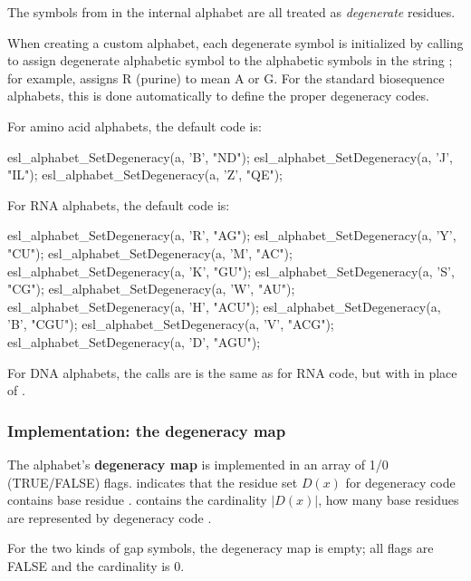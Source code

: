 The symbols from  in the internal alphabet are all
treated as \emph{degenerate} residues.

When creating a custom alphabet, each degenerate symbol is initialized
by calling  to
assign degenerate alphabetic symbol  to the alphabetic
symbols in the string ; for example,
 assigns R
(purine) to mean A or G.  For the standard biosequence alphabets, this
is done automatically to define the proper degeneracy codes. 

For amino acid alphabets, the default code is:

\begin{cchunk}  
  esl_alphabet_SetDegeneracy(a, 'B', "ND");
  esl_alphabet_SetDegeneracy(a, 'J', "IL");
  esl_alphabet_SetDegeneracy(a, 'Z', "QE");
\end{cchunk}

For RNA alphabets, the default code is:

\begin{cchunk}
  esl_alphabet_SetDegeneracy(a, 'R', "AG");
  esl_alphabet_SetDegeneracy(a, 'Y', "CU");
  esl_alphabet_SetDegeneracy(a, 'M', "AC");
  esl_alphabet_SetDegeneracy(a, 'K', "GU");
  esl_alphabet_SetDegeneracy(a, 'S', "CG");
  esl_alphabet_SetDegeneracy(a, 'W', "AU");
  esl_alphabet_SetDegeneracy(a, 'H', "ACU");
  esl_alphabet_SetDegeneracy(a, 'B', "CGU");
  esl_alphabet_SetDegeneracy(a, 'V', "ACG");
  esl_alphabet_SetDegeneracy(a, 'D', "AGU");  
\end{cchunk}

For DNA alphabets, the calls are is the same as for RNA code, but with
 in place of .


\subsubsection{Implementation: the degeneracy map}

The alphabet's \textbf{degeneracy map} is implemented in an array
 of 1/0 (TRUE/FALSE) flags.
 indicates that the residue set $D(x)$
for degeneracy code  contains base residue .
 contains the cardinality $|D(x)|$, how many base
residues are represented by degeneracy code .

For the two kinds of gap symbols, the degeneracy map is empty; all
flags are FALSE and the cardinality is 0.

